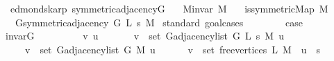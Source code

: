 \begin{isabellebody}
\ {\isacharparenleft}{\kern0pt}\ edmonds{\isacharunderscore}{\kern0pt}karp{\isacharparenright}{\kern0pt}\ symmetric{\isacharunderscore}{\kern0pt}adjacency{\isacharunderscore}{\kern0pt}G{}{\isacharunderscore}{\kern0pt}{}{\isacharcolon}{\kern0pt}\isanewline
\ \ \ {\isachardoublequoteopen}M{\isachardot}{\kern0pt}invar\ M{\isachardoublequoteclose}\isanewline
\ \ \ {\isachardoublequoteopen}is{\isacharunderscore}{\kern0pt}symmetric{\isacharunderscore}{\kern0pt}Map\ M{\isachardoublequoteclose}\isanewline
\ \ \ {\isachardoublequoteopen}G{\isachardot}{\kern0pt}symmetric{\isacharunderscore}{\kern0pt}adjacency{\isacharprime}{\kern0pt}\ {\isacharparenleft}{\kern0pt}G{}{\isacharunderscore}{\kern0pt}{}\ L\ s\ M{\isacharparenright}{\kern0pt}{\isachardoublequoteclose}%
\endisataginvisible
{\isafoldinvisible}%
%
\isadeliminvisible
\isanewline
%
\endisadeliminvisible
%
\isadelimproof
%
\endisadelimproof
%
\isatagproof
{}\isamarkupfalse%
\ {\isacharparenleft}{\kern0pt}standard{\isacharcomma}{\kern0pt}\ goal{\isacharunderscore}{\kern0pt}cases{\isacharparenright}{\kern0pt}\isanewline
\ \ \isamarkupfalse%
\ {}\isanewline
\ \ \isamarkupfalse%
\ {\isacharquery}{\kern0pt}case\isanewline
\ \ \ \ \isamarkupfalse%
\ invar{\isacharunderscore}{\kern0pt}G{}{\isacharunderscore}{\kern0pt}{}\isanewline
\ \ \ \ \isacommand{{\isachardot}{\kern0pt}}\isamarkupfalse%
\isanewline
{}\isamarkupfalse%
\isanewline
\ \ \isamarkupfalse%
\ {\isacharparenleft}{\kern0pt}{}\ v\ u{\isacharparenright}{\kern0pt}\isanewline
\ \ \isamarkupfalse%
\isanewline
\ \ \ \ {\isachardoublequoteopen}v\ {\isasymin}\ set\ {\isacharparenleft}{\kern0pt}G{\isachardot}{\kern0pt}adjacency{\isacharunderscore}{\kern0pt}list\ {\isacharparenleft}{\kern0pt}G{}{\isacharunderscore}{\kern0pt}{}\ L\ s\ M{\isacharparenright}{\kern0pt}\ u{\isacharparenright}{\kern0pt}\ {\isasymlongleftrightarrow}\isanewline
\ \ \ \ \ v\ {\isasymin}\ set\ {\isacharparenleft}{\kern0pt}G{\isachardot}{\kern0pt}adjacency{\isacharunderscore}{\kern0pt}list\ {\isacharparenleft}{\kern0pt}G{}{\isacharunderscore}{\kern0pt}{}\ M{\isacharparenright}{\kern0pt}\ u{\isacharparenright}{\kern0pt}\ {\isasymor}\isanewline
\ \ \ \ \ {\isacharparenleft}{\kern0pt}v\ {\isasymin}\ set\ {\isacharparenleft}{\kern0pt}free{\isacharunderscore}{\kern0pt}vertices\ L\ M{\isacharparenright}{\kern0pt}\ {\isasymand}\ u\ {\isacharequal}{\kern0pt}\ s{\isacharparenright}{\kern0pt}\ {\isasymor}\isanewline

\end{isabellebody}
